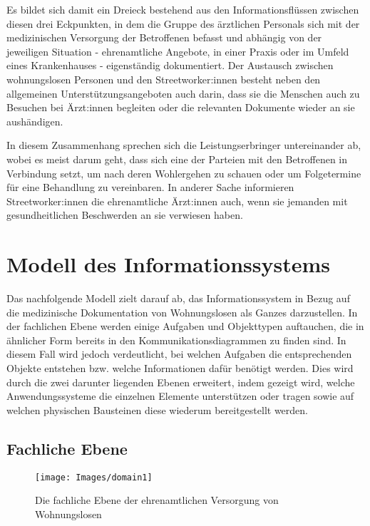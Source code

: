 Es bildet sich damit ein Dreieck bestehend aus den Informationsflüssen zwischen diesen drei Eckpunkten, in dem die Gruppe des ärztlichen Personals sich mit der medizinischen Versorgung der Betroffenen befasst und abhängig von der jeweiligen Situation - ehrenamtliche Angebote, in einer Praxis oder im Umfeld eines Krankenhauses - eigenständig dokumentiert. Der Austausch zwischen wohnungslosen Personen und den Streetworker:innen besteht neben den allgemeinen Unterstützungsangeboten auch darin, dass sie die Menschen auch zu Besuchen bei Ärzt:innen begleiten oder die relevanten Dokumente wieder an sie aushändigen.

In diesem Zusammenhang sprechen sich die Leistungserbringer untereinander ab, wobei es meist darum geht, dass sich eine der Parteien mit den Betroffenen in Verbindung setzt, um nach deren Wohlergehen zu schauen oder um Folgetermine für eine Behandlung zu vereinbaren. In anderer Sache informieren Streetworker:innen die ehrenamtliche Ärzt:innen auch, wenn sie jemanden mit gesundheitlichen Beschwerden an sie verwiesen haben.


\section{Modell des Informationssystems}\label{sec:3lgm2model}

Das nachfolgende Modell zielt darauf ab, das Informationssystem in Bezug auf die medizinische Dokumentation von Wohnungslosen als Ganzes darzustellen. In der fachlichen Ebene werden einige Aufgaben und Objekttypen auftauchen, die in ähnlicher Form bereits in den Kommunikationsdiagrammen zu finden sind. In diesem Fall wird jedoch verdeutlicht, bei welchen Aufgaben die entsprechenden Objekte entstehen bzw. welche Informationen dafür benötigt werden. Dies wird durch die zwei darunter liegenden Ebenen erweitert, indem gezeigt wird, welche Anwendungssysteme die einzelnen Elemente unterstützen oder tragen sowie auf welchen physischen Bausteinen diese wiederum bereitgestellt werden.

\subsection{Fachliche Ebene}

\begin{figure}[h]
	\centering
	\texttt{[image: Images/domain1]}
	\caption[Fachliche Ebene - ehrenamtliche Versorgung]{Die fachliche Ebene der ehrenamtlichen Versorgung von Wohnungslosen}
	\label{fig:domain1}
\end{figure}

